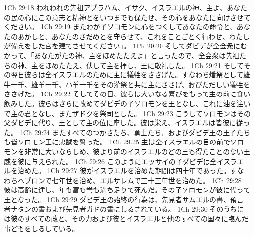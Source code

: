 1Ch 29:18  われわれの先祖アブラハム、イサク、イスラエルの神、主よ、あなたの民の心にこの意志と精神とをいつまでも保たせ、その心をあなたに向けさせてください。
1Ch 29:19  またわが子ソロモンに心をつくしてあなたの命令と、あなたのあかしと、あなたのさだめとを守らせて、これをことごとく行わせ、わたしが備えをした宮を建てさせてください」。
1Ch 29:20  そしてダビデが全会衆にむかって、「あなたがたの神、主をほめたたえよ」と言ったので、全会衆は先祖たちの神、主をほめたたえ、伏して主を拝し、王に敬礼した。
1Ch 29:21  そしてその翌日彼らは全イスラエルのために主に犠牲をささげた。すなわち燔祭として雄牛一千、雄羊一千、小羊一千をその灌祭と共に主にささげ、おびただしい犠牲をささげた。
1Ch 29:22  そしてその日、彼らは大いなる喜びをもって主の前に食い飲みした。彼らはさらに改めてダビデの子ソロモンを王となし、これに油を注いで主の君となし、またザドクを祭司とした。
1Ch 29:23  こうしてソロモンはその父ダビデに代り、王として主の位に座した。彼は栄え、イスラエルは皆彼に従った。
1Ch 29:24  またすべてのつかさたち、勇士たち、およびダビデ王の王子たちも皆ソロモン王に忠誠を誓った。
1Ch 29:25  主は全イスラエルの目の前でソロモンを非常に大いならしめ、彼より前のイスラエルのどの王も得たことのない王威を彼に与えられた。
1Ch 29:26  このようにエッサイの子ダビデは全イスラエルを治めた。
1Ch 29:27  彼がイスラエルを治めた期間は四十年であった。すなわちヘブロンで七年世を治め、エルサレムで三十三年世を治めた。
1Ch 29:28  彼は高齢に達し、年も富も誉も満ち足りて死んだ。その子ソロモンが彼に代って王となった。
1Ch 29:29  ダビデ王の始終の行為は、先見者サムエルの書、預言者ナタンの書および先見者ガドの書にしるされている。
1Ch 29:30  そのうちには彼のすべての政と、その力および彼とイスラエルと他のすべての国々に臨んだ事どもをしるしている。


